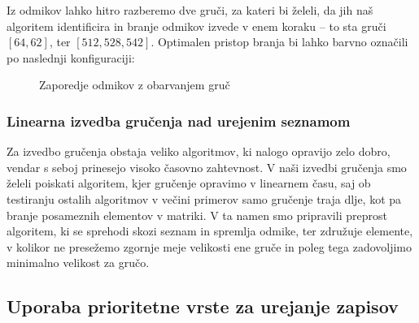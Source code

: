 \documentclass[a4paper,12pt,openright]{book}
\begin{document}
\noindent Iz odmikov lahko hitro razberemo dve gruči, za kateri bi želeli, da jih naš algoritem identificira in branje odmikov izvede v enem koraku – to sta gruči $[64, 62]$, ter $[512, 528, 542]$. Optimalen pristop branja bi lahko barvno označili po naslednji konfiguraciji:

\hfill \break
\begin{figure}[H]
\begin{center}
\caption{Zaporedje odmikov z obarvanjem gruč}
\end{center}
\end{figure}
        
        \subsubsection{Linearna izvedba gručenja nad urejenim seznamom}
        Za izvedbo gručenja obstaja veliko algoritmov, ki nalogo opravijo zelo dobro, vendar s seboj prinesejo visoko časovno zahtevnost. V naši izvedbi gručenja smo želeli poiskati algoritem, kjer gručenje opravimo v linearnem času, saj ob testiranju ostalih algoritmov v večini primerov samo gručenje traja dlje, kot pa branje posameznih elementov v matriki. V ta namen smo pripravili preprost algoritem, ki se sprehodi skozi seznam in spremlja odmike, ter združuje elemente, v kolikor ne presežemo zgornje meje velikosti ene gruče in poleg tega zadovoljimo minimalno velikost za gručo.
        
        \subsection{Uporaba prioritetne vrste za urejanje zapisov}
\end{document}
